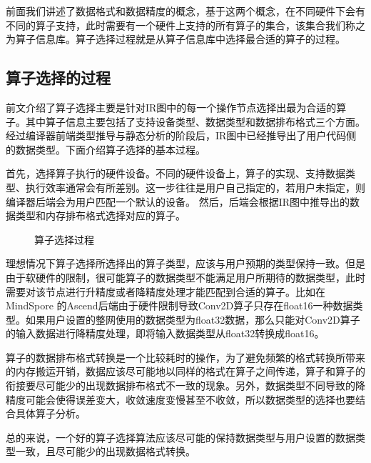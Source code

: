 \documentclass[letterpaper,10pt,english]{sphinxmanual}
\let\sphinxpxdimen\pdfpxdimen\else\newdimen\sphinxpxdimen
\begin{document}
\sphinxAtStartPar
{}

\sphinxAtStartPar
前面我们讲述了数据格式和数据精度的概念，基于这两个概念，在不同硬件下会有不同的算子支持，此时需要有一个硬件上支持的所有算子的集合，该集合我们称之为算子信息库。算子选择过程就是从算子信息库中选择最合适的算子的过程。


\subsection{算子选择的过程}
\label{\detokenize{chapter_backend_and_runtime/kernel_selecter:id3}}
\sphinxAtStartPar
前文介绍了算子选择主要是针对IR图中的每一个操作节点选择出最为合适的算子。其中算子信息主要包括了支持设备类型、数据类型和数据排布格式三个方面。经过编译器前端类型推导与静态分析的阶段后，IR图中已经推导出了用户代码侧的数据类型。下面介绍算子选择的基本过程。

\sphinxAtStartPar
首先，选择算子执行的硬件设备。不同的硬件设备上，算子的实现、支持数据类型、执行效率通常会有所差别。这一步往往是用户自己指定的，若用户未指定，则编译器后端会为用户匹配一个默认的设备。
然后，后端会根据IR图中推导出的数据类型和内存排布格式选择对应的算子。

\begin{figure}[H]
\centering
\capstart

\noindent\sphinxincludegraphics[width=800\sphinxpxdimen]{{select_kernel}.png}
\caption{算子选择过程}\label{\detokenize{chapter_backend_and_runtime/kernel_selecter:id9}}\label{\detokenize{chapter_backend_and_runtime/kernel_selecter:select-kernel}}\end{figure}

\sphinxAtStartPar
理想情况下算子选择所选择出的算子类型，应该与用户预期的类型保持一致。但是由于软硬件的限制，很可能算子的数据类型不能满足用户所期待的数据类型，此时需要对该节点进行升精度或者降精度处理才能匹配到合适的算子。比如在MindSpore
的Ascend后端由于硬件限制导致Conv2D算子只存在float16一种数据类型。如果用户设置的整网使用的数据类型为float32数据，那么只能对Conv2D算子的输入数据进行降精度处理，即将输入数据类型从float32转换成float16。

\sphinxAtStartPar
算子的数据排布格式转换是一个比较耗时的操作，为了避免频繁的格式转换所带来的内存搬运开销，数据应该尽可能地以同样的格式在算子之间传递，算子和算子的衔接要尽可能少的出现数据排布格式不一致的现象。另外，数据类型不同导致的降精度可能会使得误差变大，收敛速度变慢甚至不收敛，所以数据类型的选择也要结合具体算子分析。

\sphinxAtStartPar
总的来说，一个好的算子选择算法应该尽可能的保持数据类型与用户设置的数据类型一致，且尽可能少的出现数据格式转换。
\end{document}
